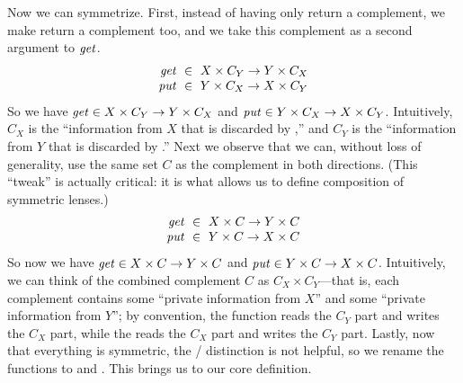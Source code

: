 Now we can symmetrize.  
First, instead of having only \GET{} return a complement, we make \PUT{}
return a complement too, and we take this complement as a second argument
to $\mathit{get}$.
%
\iffull
\[
\begin{array}{r@{\ \;}c@{\ \;}l}
\GET &\in& X \times C_Y \arrow Y \times C_X\\
\PUT &\in& Y \times C_X \arrow X \times C_Y
\end{array}
\]
\else
So we have $\mathit{get} \in X \times C_Y \rightarrow Y \times C_X$ and 
$\mathit{put} \in Y \times C_X \rightarrow X \times C_Y$.
\fi
%
Intuitively, $C_X$ is the ``information from $X$ that is discarded by
\GET,'' and $C_Y$ is the ``information from $Y$ that is discarded by
\PUT.''  Next we observe that we can, without loss of generality, use the
same set $C$ as the complement in both directions.  \iffull (This ``tweak''
is actually critical: it is what allows us to define composition of symmetric
lenses.)\fi
\iffull
\[
\begin{array}{r@{\ \;}c@{\ \;}l}
\GET &\in& X \times C \arrow Y \times C\\
\PUT &\in& Y \times C \arrow X \times C
\end{array}
\]
\else
So now we have 
$\mathit{get} \in X \times C \rightarrow Y \times C$ and
$\mathit{put} \in Y \times C \rightarrow X \times C$.
\fi
%
Intuitively, we can think of the combined complement $C$ as $C_X \times
C_Y$---that is, each complement contains some ``private information from
$X$'' and some ``private information from $Y$''; by convention, the \GET{}
function reads the $C_Y$ part and writes the $C_X$ part, while the \PUT{}
reads the $C_X$ part and writes the $C_Y$ part.  
%
Lastly, now that everything is symmetric, the \GET{} / \PUT{} distinction is not
helpful, so we rename the functions to \PUTR{} and \PUTL.  This brings us to
our core definition.

